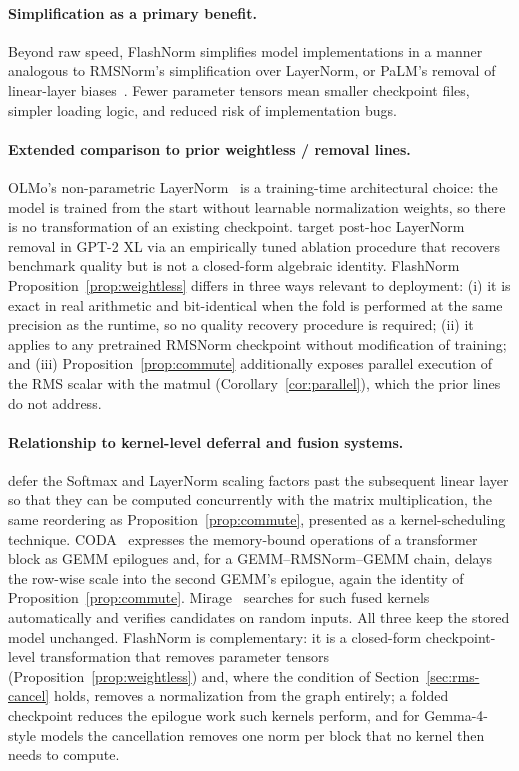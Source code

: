 \documentclass{article}
\begin{document}
\paragraph{Simplification as a primary benefit.}
Beyond raw speed, FlashNorm simplifies model implementations in a manner analogous
to RMSNorm's simplification over LayerNorm, or PaLM's removal of linear-layer
biases~\citep{PaLM}. Fewer parameter tensors mean smaller checkpoint
files, simpler loading logic, and reduced risk of implementation bugs.

\paragraph{Extended comparison to prior weightless / removal lines.} OLMo's non-parametric LayerNorm~\citep{olmo2} is a training-time architectural choice: the model is trained from the start without learnable normalization weights, so there is no transformation of an existing checkpoint. \citet{remove-norm2} target post-hoc LayerNorm removal in GPT-2 XL via an empirically tuned ablation procedure that recovers benchmark quality but is not a closed-form algebraic identity. FlashNorm Proposition~\ref{prop:weightless} differs in three ways relevant to deployment: (i) it is exact in real arithmetic and bit-identical when the fold is performed at the same precision as the runtime, so no quality recovery procedure is required; (ii) it applies to any pretrained RMSNorm checkpoint without modification of training; and (iii) Proposition~\ref{prop:commute} additionally exposes parallel execution of the RMS scalar with the matmul (Corollary~\ref{cor:parallel}), which the prior lines do not address.

\paragraph{Relationship to kernel-level deferral and fusion systems.} \citet{opFusion} defer the Softmax and LayerNorm scaling factors past the subsequent linear layer so that they can be computed concurrently with the matrix multiplication, the same reordering as Proposition~\ref{prop:commute}, presented as a kernel-scheduling technique. CODA~\citep{coda} expresses the memory-bound operations of a transformer block as GEMM epilogues and, for a GEMM--RMSNorm--GEMM chain, delays the row-wise scale into the second GEMM's epilogue, again the identity of Proposition~\ref{prop:commute}. Mirage~\citep{mirage} searches for such fused kernels automatically and verifies candidates on random inputs. All three keep the stored model unchanged. FlashNorm is complementary: it is a closed-form checkpoint-level transformation that removes parameter tensors (Proposition~\ref{prop:weightless}) and, where the condition of Section~\ref{sec:rms-cancel} holds, removes a normalization from the graph entirely; a folded checkpoint reduces the epilogue work such kernels perform, and for Gemma-4-style models the cancellation removes one norm per block that no kernel then needs to compute.
\end{document}
